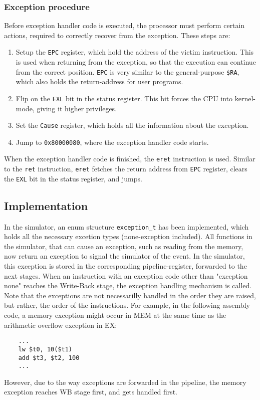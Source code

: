 \subsubsection{Exception procedure}
\label{sec:exception_procedure}
Before exception handler code is executed, the processor must perform certain
actions, required to correctly recover from the exception. These steps are\cite{see_mips_run}:
\begin{enumerate}
\item Setup the \texttt{EPC} register, which hold the address of the victim
instruction. This is used when returning from the exception, so that the
execution can continue from the correct position. \texttt{EPC} is very similar to the
general-purpose \texttt{\$RA}, which also holds the return-address for user
programs.
\item Flip on the \texttt{EXL} bit in the status register. This bit forces the
CPU into kernel-mode, giving it higher privileges.
\item Set the \texttt{Cause} register, which holds all the information about
the exception.
\item Jump to \texttt{0x80000080}, where the exception handler code starts.
\end{enumerate}
When the exception handler code is finished, the \texttt{eret} instruction is
used. Similar to the \texttt{ret} instruction, \texttt{eret} fetches the return
address from \texttt{EPC} register, clears the \texttt{EXL} bit in the status
register, and jumps.


\subsection{Implementation}
In the simulator, an enum structure \texttt{exception\_t} has been implemented, which
holds all the necessary excetion types (none-exception included).
All functions in the simulator, that can cause an exception, such as reading
from the memory, now return an exception to signal the simulator of the event.
In the simulator, this exception is stored in the corresponding pipeline-register,
forwarded to the next stages. When an instruction with an exception code other
than "exception none" reaches the Write-Back stage, the exception handling
mechanism is called.\\
Note that the exceptions are not necessarilly handled in the order they are
raised, but rather, the order of the instructions. For example, in the following
assembly code, a memory exception might occur in MEM at the same time as the arithmetic
overflow exception in EX:
\begin{lstlisting}
	...
	lw $t0, 10($t1)
	add $t3, $t2, 100
	...
\end{lstlisting}
However, due to the way exceptions are forwarded in the pipeline, the memory
exception reaches WB stage first, and gets handled first.

